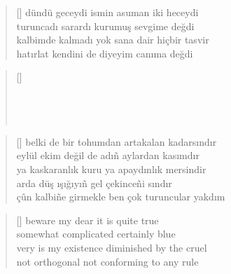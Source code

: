 \documentclass[10pt, openright, twoside]{memoir}
\theoremstyle{definition}
\begin{document}
\vspace*{\fill}
%
\newpage
{}
\vspace*{\fill}
\settowidth{\versewidth}{kalbimde kalmadı yok sana dair hiçbir tasvir}
\begin{verse}[\versewidth]
  dündü geceydi ismin asuman iki heceydi \\
  turuncadı sarardı kurumuş sevgime değdi \\
  kalbimde kalmadı yok sana dair hiçbir tasvir \\
  hatırlat kendini de diyeyim canıma değdi \\
\end{verse}
\vspace*{\fill}
%
\newpage
{}
\vspace*{\fill}
\begin{verse}[\versewidth]
  \phantom{}\\
  \phantom{}\\
  \phantom{}\\
  \phantom{}\\
\end{verse}
\vspace*{\fill}
%
\newpage
{}
\vspace*{\fill}
\settowidth{\versewidth}{çûn kalbi\~ne girmekle ben çok turuncular yakdım}
\begin{verse}[\versewidth]
  belki de bir tohumdan artakalan kadarsındır \\
  eylül ekim değil de adı\~n aylardan kasımdır \\
  ya kaskaranlık kuru ya apaydınlık mersindir \\
  arda düş ışığıyı\~n gel çekince\~ni sındır \\
  çûn kalbi\~ne girmekle ben çok turuncular yakdım \\
\end{verse}
\vspace*{\fill}
%
\newpage
{}
\vspace*{\fill}
\settowidth{\versewidth}{very is my existence diminished by the cruel}
\begin{verse}[\versewidth]
  beware my dear it is quite true \\
  somewhat complicated certainly blue \\
  very is my existence diminished by the cruel \\
  not orthogonal not conforming to any rule \\
\end{verse}
\end{document}
